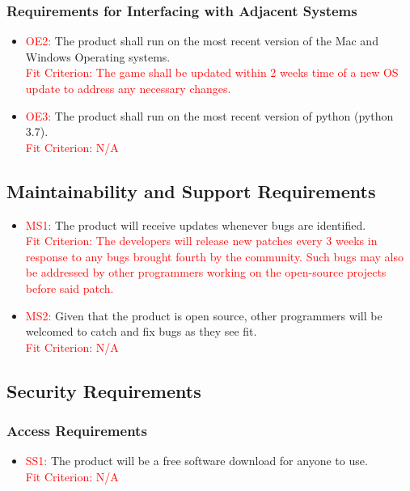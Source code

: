 \documentclass[12pt, titlepage]{article}
\begin{document}
\subsubsection{Requirements for Interfacing with Adjacent Systems}
\begin{itemize}
\item \textcolor{red}{OE2: }The product shall run on the most recent version of the Mac and Windows Operating systems.\\
\textcolor{red}{Fit Criterion: The game shall be updated within 2 weeks time of a new OS update to address any necessary changes.}
\item \textcolor{red}{OE3: }The product shall run on the most recent version of python (python 3.7).\\
\textcolor{red}{Fit Criterion: N/A}
\end{itemize}

\subsection{Maintainability and Support Requirements}
\begin{itemize}
    \item \textcolor{red}{MS1: }The product will receive updates whenever bugs are identified.\\
    \textcolor{red}{Fit Criterion: The developers will release new patches every 3 weeks in response to any bugs brought fourth by the community. Such bugs may also be addressed by other programmers working on the open-source projects before said patch.}
    \item \textcolor{red}{MS2: }Given that the product is open source, other programmers will be welcomed to catch and fix bugs as they see fit.\\
    \textcolor{red}{Fit Criterion: N/A}
\end{itemize}

\subsection{Security Requirements}
\subsubsection{Access Requirements}
\begin{itemize}
    \item \textcolor{red}{SS1: }The product will be a free software download for anyone to use.\\
    \textcolor{red}{Fit Criterion: N/A}
\end{itemize}
\end{document}
